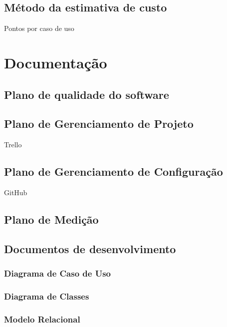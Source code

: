\subsection{Método da estimativa de custo}

Pontos por caso de uso

\section{Documentação}

\subsection{Plano de qualidade do software}

\subsection{Plano de Gerenciamento de Projeto}

Trello

\subsection{Plano de Gerenciamento de Configuração}

GitHub

\subsection{Plano de Medição}

\subsection{Documentos de desenvolvimento}

\subsubsection{Diagrama de Caso de Uso}

\subsubsection{Diagrama de Classes}

\subsubsection{Modelo Relacional} 

